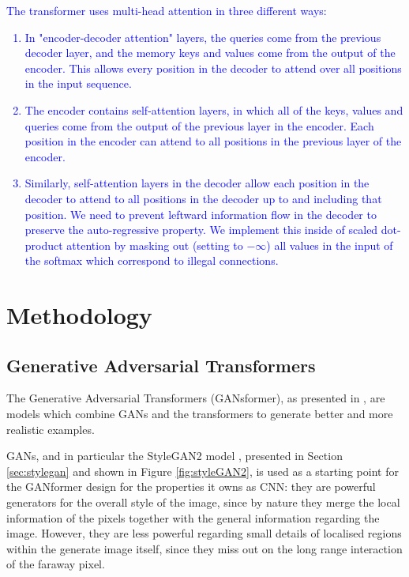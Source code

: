 \documentclass{article}
\begin{document}
	\textcolor{blue}{
	The transformer uses multi-head attention in three different ways:
	\begin{enumerate}
		\item In "encoder-decoder attention" layers, the queries come from the previous decoder layer, 
		and the memory keys and values come from the output of the encoder. This allows every position 
		in the decoder to attend over all positions in the input sequence.
		\item The encoder contains self-attention layers, in which all of the keys, values 
		and queries come from the output of the previous layer in the encoder. 
		Each position in the encoder can attend to all positions in the previous layer of the encoder.
		\item Similarly, self-attention layers in the decoder allow each position in the decoder to attend to 
		all positions in the decoder up to and including that position. We need to prevent leftward 
		information flow in the decoder to preserve the auto-regressive property. We implement this 
		inside of scaled dot-product attention by masking out (setting to $-\infty$) all values in the input 
		of the softmax which correspond to illegal connections. 
	\end{enumerate}
	}
	
	\section{Methodology}
	
	\subsection{Generative Adversarial Transformers}%
	The Generative Adversarial Transformers (GANsformer), as presented in 
	\cite{hudson2021generative}, are models which combine GANs and the transformers to generate 
	better and more realistic examples.
	
	GANs, and in particular the StyleGAN2 model \cite{karras2020analyzing}, presented in Section 
	\ref{sec:stylegan} and shown in Figure \ref{fig:styleGAN2}, is used as a starting point for the 
	GANformer design for the properties it owns as CNN: they are powerful generators for the overall 
	style of the image, since by nature they merge the local information of the pixels together with the 
	general information regarding the image. 
	However, they are less powerful regarding small details of localised regions within the generate 
	image itself, since they miss out on the long range interaction of the faraway pixel.
	
\end{document}
